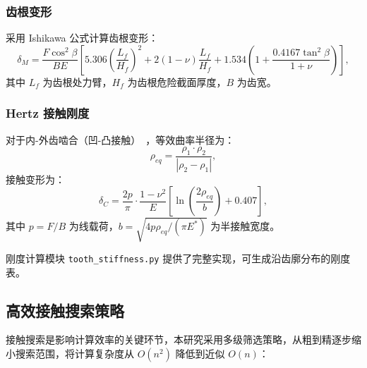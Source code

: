 \documentclass[12pt]{ctexart}
\begin{document}
\subsubsection{齿根变形}

采用 Ishikawa 公式计算齿根变形：
\begin{equation}
\delta_M = \frac{F\cos^2\beta}{BE} \left[ 5.306\left(\frac{L_f}{H_f}\right)^2 + 2(1-\nu)\frac{L_f}{H_f} + 1.534\left(1 + \frac{0.4167\tan^2\beta}{1+\nu}\right) \right],
\end{equation}
其中 $L_f$ 为齿根处力臂，$H_f$ 为齿根危险截面厚度，$B$ 为齿宽。

\subsubsection{Hertz 接触刚度}

对于内-外齿啮合（凹-凸接触）~\cite{johnson}，等效曲率半径为：
\begin{equation}
\rho_{eq} = \frac{\rho_1 \cdot \rho_2}{|\rho_2 - \rho_1|},
\end{equation}
接触变形为：
\begin{equation}
\delta_C = \frac{2p}{\pi} \cdot \frac{1-\nu^2}{E} \left[ \ln\left(\frac{2\rho_{eq}}{b}\right) + 0.407 \right],
\end{equation}
其中 $p = F/B$ 为线载荷，$b = \sqrt{4p\rho_{eq}/(\pi E^*)}$ 为半接触宽度。

刚度计算模块 \texttt{tooth\_stiffness.py} 提供了完整实现，可生成沿齿廓分布的刚度表。

\subsection{高效接触搜索策略}

接触搜索是影响计算效率的关键环节，本研究采用多级筛选策略，从粗到精逐步缩小搜索范围，将计算复杂度从 $O(n^2)$ 降低到近似 $O(n)$：
\end{document}
